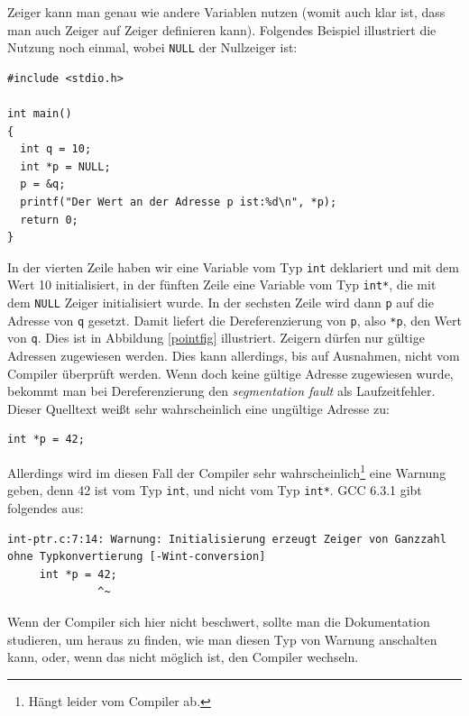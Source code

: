 Zeiger kann man genau wie andere Variablen nutzen (womit auch klar ist, dass man auch Zeiger auf Zeiger definieren kann).
Folgendes Beispiel illustriert die Nutzung noch einmal, wobei \verb|NULL| der Nullzeiger ist:
\begin{lstlisting}
#include <stdio.h>

int main()
{
  int q = 10;
  int *p = NULL;
  p = &q;
  printf("Der Wert an der Adresse p ist:%d\n", *p);
  return 0;
}
\end{lstlisting}
In der vierten Zeile haben wir eine Variable vom Typ \verb|int| deklariert und mit dem Wert 10 initialisiert, in der fünften Zeile eine Variable vom Typ \verb|int*|, die mit dem \verb|NULL| Zeiger initialisiert wurde.
In der sechsten Zeile wird dann \verb|p| auf die Adresse von \verb|q| gesetzt.
Damit liefert die Dereferenzierung von \verb|p|, also \verb|*p|, den Wert von \verb|q|.
Dies ist in Abbildung \ref{pointfig} illustriert.
Zeigern dürfen nur gültige Adressen zugewiesen werden.
Dies kann allerdings, bis auf Ausnahmen, nicht vom Compiler überprüft werden.
Wenn doch keine gültige Adresse zugewiesen wurde, bekommt man bei Dereferenzierung den \emph{segmentation fault} als Laufzeitfehler.
Dieser Quelltext weißt sehr wahrscheinlich eine ungültige Adresse zu:
\begin{lstlisting}
int *p = 42;
\end{lstlisting}
Allerdings wird im diesen Fall der Compiler sehr wahrscheinlich\footnote{Hängt leider vom Compiler ab.} eine Warnung geben, denn 42 ist vom Typ \verb|int|, und nicht vom Typ \verb|int*|.
GCC 6.3.1 gibt folgendes aus:
\begin{verbatim}
int-ptr.c:7:14: Warnung: Initialisierung erzeugt Zeiger von Ganzzahl ohne Typkonvertierung [-Wint-conversion]
     int *p = 42;
              ^~
\end{verbatim}
Wenn der Compiler sich hier nicht beschwert, sollte man die Dokumentation studieren, um heraus zu finden, wie man diesen Typ von Warnung anschalten kann, oder, wenn das nicht möglich ist, den Compiler wechseln.




